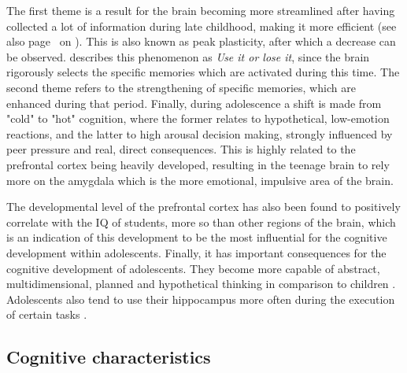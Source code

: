 The first theme is a result for the brain becoming more streamlined after having collected a lot of information during late childhood, making it more efficient (see also page~\pageref{subsec:interferencedecay} on ). This is also known as peak plasticity, after which a decrease can be observed.  describes this phenomenon as \emph{Use it or lose it}, since the brain rigorously selects the specific memories which are activated during this time. The second theme refers to the strengthening of specific memories, which are enhanced during that period. Finally, during adolescence a shift is made from "cold" to "hot" cognition, where the former relates to hypothetical, low-emotion reactions, and the latter to high arousal decision making, strongly influenced by peer pressure and real, direct consequences. This is highly related to the prefrontal cortex being heavily developed, resulting in the teenage brain to rely more on the amygdala which is the more emotional, impulsive area of the brain.

The developmental level of the prefrontal cortex has also been found to positively correlate with the IQ of students, more so than other regions of the brain, which is an indication of this development to be the most influential for the cognitive development within adolescents. Finally, it has important consequences for the cognitive development of adolescents. They become more capable of abstract, multidimensional, planned and hypothetical thinking in comparison to children \cite{steinberg}. Adolescents also tend to use their hippocampus more often during the execution of certain tasks \cite{finn}.

\subsection{Cognitive characteristics}

